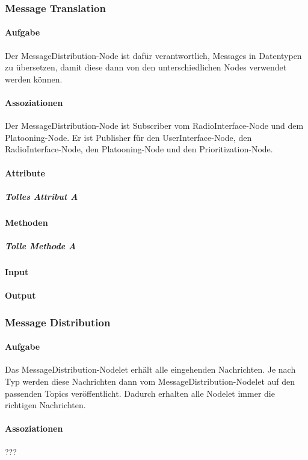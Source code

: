 \documentclass[a4paper, 12pt, titlepage]{scrartcl}
\begin{document}
			\subsubsection{Message Translation}
			\label{message_translation}
				\paragraph{Aufgabe} Der MessageDistribution-Node ist dafür verantwortlich, Messages in Datentypen zu übersetzen, damit diese dann von den unterschiedlichen Nodes verwendet werden können.
				\paragraph{Assoziationen} Der MessageDistribution-Node ist Subscriber vom RadioInterface-Node und dem Platooning-Node. Er ist Publisher für den UserInterface-Node, den RadioInterface-Node, den Platooning-Node und den Prioritization-Node.
				\paragraph{Attribute}
					\subparagraph{Tolles Attribut A}
				\paragraph{Methoden}
					\subparagraph{Tolle Methode A}
				\paragraph{Input}
				\paragraph{Output}

			\subsubsection{Message Distribution}
			\label{message_distribution}
				\paragraph{Aufgabe} Das MessageDistribution-Nodelet erhält alle eingehenden Nachrichten. Je nach Typ werden diese Nachrichten dann vom MessageDistribution-Nodelet auf den passenden Topics veröffentlicht. Dadurch erhalten alle Nodelet immer die richtigen Nachrichten.
				\paragraph{Assoziationen} ???
\end{document}
